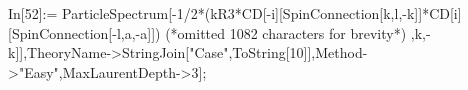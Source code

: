 In[52]:= ParticleSpectrum[-1/2*(kR3*CD[-i][SpinConnection[k,l,-k]]*CD[i][SpinConnection[-l,a,-a]]) (*omitted 1082 characters for brevity*) ,k,-k]],TheoryName->StringJoin["Case",ToString[10]],Method->"Easy",MaxLaurentDepth->3];